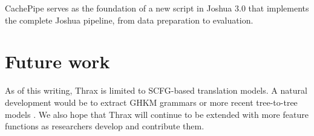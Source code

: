 \documentclass[11pt]{article}
\begin{document}
CachePipe serves as the foundation of a new script in Joshua 3.0 that
implements the complete Joshua pipeline, from data preparation to
evaluation.

\section{Future work}

As of this writing, Thrax is limited to SCFG-based translation models.
A natural development would be to extract GHKM grammars
\cite{galley2004whats} or more recent tree-to-tree models
\cite{zhang2008,liu2009,chiang2010}.  We also hope that Thrax will
continue to be extended with more feature functions as researchers
develop and contribute them.




\end{document}
